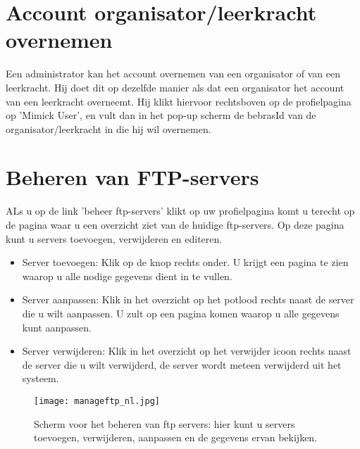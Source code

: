 \documentclass[11pt,a4paper]{report}
\begin{document}
\section{Account organisator/leerkracht overnemen}
Een administrator kan het account overnemen van een organisator of van een leerkracht. Hij doet dit op dezelfde manier als dat een organisator het account van een leerkracht overneemt. Hij klikt hiervoor rechtsboven op de profielpagina op 'Mimick User', en vult dan in het pop-up scherm de bebrasId van de organisator/leerkracht in die hij wil overnemen.

\section{Beheren van FTP-servers}
ALs u op de link 'beheer ftp-servers' klikt op uw profielpagina komt u terecht op de pagina waar u een overzicht ziet van de huidige ftp-servers. Op deze pagina kunt u servers toevoegen, verwijderen en editeren. 
\begin{itemize} 
	\item Server toevoegen: Klik op de knop rechts onder. U krijgt een pagina te zien waarop u alle nodige gegevens dient in te vullen. 
	\item Server aanpassen: Klik in het overzicht op het potlood rechts naast de server die u wilt aanpassen. U zult op een pagina komen waarop u alle gegevens kunt aanpassen.
	\item Server verwijderen: Klik in het overzicht op het verwijder icoon rechts naast de server die u wilt verwijderd, de server wordt meteen verwijderd uit het systeem.
\end{itemize}

\begin{figure}[h!]
\centering
\texttt{[image: manageftp\_nl.jpg]}
\caption{Scherm voor het beheren van ftp servers: hier kunt u servers toevoegen, verwijderen, aanpassen en de gegevens ervan bekijken.}
\label{fig:manageftp}
\end{figure}
\end{document}

